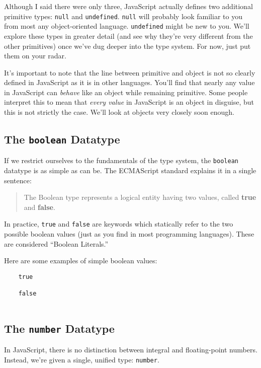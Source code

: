 \documentclass[11pt,letter]{book}
\begin{document}
    Although I said there were only three, JavaScript actually defines two additional primitive 
    types: \texttt{null} and \texttt{undefined}. \texttt{null} will probably look familiar to 
    you from most any object-oriented language. \texttt{undefined} might be new to you. We'll 
    explore these types in greater detail (and see why they're very different from the other 
    primitives) once we've dug deeper into the type system. For now, just put them on your radar.
    
    It's important to note that the line between primitive and object is not so clearly defined
    in JavaScript as it is in other languages. You'll find that nearly any value in JavaScript can
    \emph{behave} like an object while remaining primitive. Some people interpret this to mean that
    \emph{every value} in JavaScript is an object in disguise, but this is not strictly the case.
    We'll look at objects very closely soon enough.
    
    \subsection{The \texttt{boolean} Datatype}
    If we restrict ourselves to the fundamentals of the type system, the \texttt{boolean} 
    datatype is as simple as can be. The ECMAScript standard explains it in a single sentence:
    
    \begin{quote}
        The Boolean type represents a logical entity having two values, called \textbf{true}
        and \textbf{false}.
    \end{quote}
    
    In practice, \texttt{true} and \texttt{false} are keywords which  statically refer to the two 
    possible boolean values (just as you find in most programming languages). These are considered 
    ``Boolean Literals.''
    
    Here are some examples of simple boolean values:
    
    \begin{verbatim}
    true
    
    false
    
    \end{verbatim}
    
    \subsection{The \texttt{number} Datatype}
    In JavaScript, there is no distinction between integral and floating-point numbers. Instead, 
    we're given a single, unified type: \texttt{number}.
    
\end{document}
